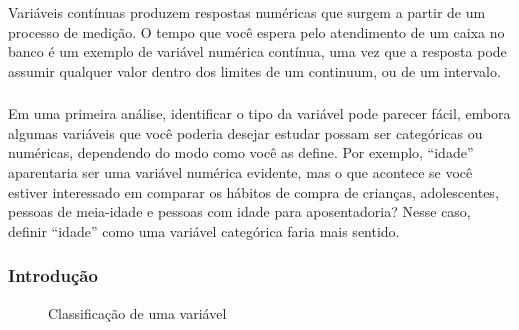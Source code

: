 \documentclass[12pt]{beamer}
\begin{document}
\begin{frame}{}
\frametitle{}
\begin{block}{}
\justifying
Variáveis contínuas produzem respostas numéricas que surgem a partir de um processo de medição. O tempo que você espera pelo atendimento de um caixa no banco 
é um exemplo de variável numérica contínua, uma vez que a resposta pode assumir qualquer valor dentro dos limites de um continuum, ou de um intervalo.
\end{block}
\end{frame}

\begin{frame}{}
\frametitle{}
\begin{block}{}
\justifying
Em uma primeira análise, identificar o tipo da variável pode parecer fácil, embora algumas variáveis que você poderia desejar estudar possam ser categóricas ou numéricas, 
dependendo do modo como você as define. Por exemplo, ``idade'' aparentaria ser uma variável numérica evidente, mas o que acontece se você estiver interessado em 
comparar os hábitos de compra de crianças, adolescentes, pessoas de meia-idade e pessoas com idade para aposentadoria? Nesse caso, definir ``idade'' como uma 
variável categórica faria mais sentido. 
\end{block}
\end{frame}

\begin{frame}{}
\frametitle{Introdução}
\begin{block}{}
\justifying
\begin{figure}[H]
    \centering
    \caption{Classificação de uma variável}
    \label{Fig2_ex}
  \end{figure}
\end{block}
\end{frame}
\end{document}
